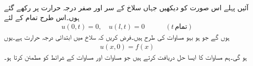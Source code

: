 آئیں پہلے اس صورت کو دیکھیں جہاں سلاخ کے سر  اور  صفر درجہ حرارت پر رکھے گئے ہوں۔اس طرح  تمام  کے لئے 
\begin{align}\label{مساوات_جزوی_حراری_ب}
u(0,t)=0,\quad u(l,t)=0\quad \quad \quad (t\,\text{تمام})
\end{align}
ہوں گے جو ہو بہو مساوات  کی طرح ہیں۔فرض کریں کہ سلاخ میں ابتدائی درجہ حرارت  ہے۔یوں 
\begin{align}\label{مساوات_جزوی_حراری_پ}
u(x,0)=f(x)
\end{align}
ہو گی۔ہم مساوات  کا ایسا حل  دریافت کرتے ہیں جو مساوات  اور مساوات  کے شرائط کو  مطمئن کرتا ہو۔

